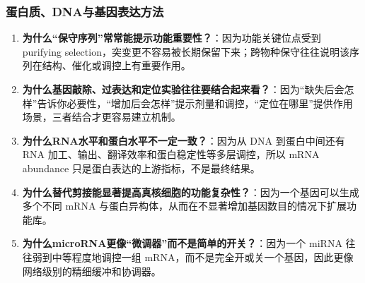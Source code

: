 \documentclass[12pt,fontset=none]{ctexart}
\begin{document}
\subsubsection*{蛋白质、DNA与基因表达方法}
\begin{enumerate}
\item \textbf{为什么“保守序列”常常能提示功能重要性？}：因为功能关键位点受到 purifying selection，突变更不容易被长期保留下来；跨物种保守往往说明该序列在结构、催化或调控上有重要作用。

\item \textbf{为什么基因敲除、过表达和定位实验往往要结合起来看？}：因为“缺失后会怎样”告诉你必要性，“增加后会怎样”提示剂量和调控，“定位在哪里”提供作用场景，三者结合才更容易建立机制。

\item \textbf{为什么RNA水平和蛋白水平不一定一致？}：因为从 DNA 到蛋白中间还有 RNA 加工、输出、翻译效率和蛋白稳定性等多层调控，所以 mRNA abundance 只是蛋白表达的上游指标，不是最终结果。

\item \textbf{为什么替代剪接能显著提高真核细胞的功能复杂性？}：因为一个基因可以生成多个不同 mRNA 与蛋白异构体，从而在不显著增加基因数目的情况下扩展功能库。

\item \textbf{为什么microRNA更像“微调器”而不是简单的开关？}：因为一个 miRNA 往往弱到中等程度地调控一组 mRNA，而不是完全开或关一个基因，因此更像网络级别的精细缓冲和协调器。

\end{enumerate}
\end{document}
